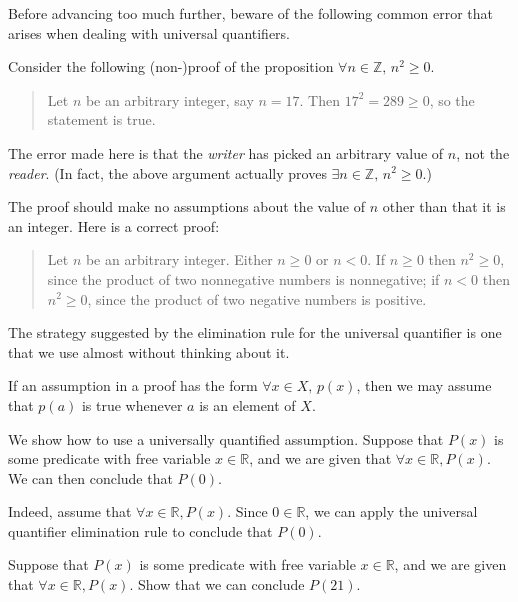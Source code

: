 Before advancing too much further, beware of the following common error that arises when dealing with universal quantifiers.

\begin{commonerror}
Consider the following (non-)proof of the proposition $\forall n \in \mathbb{Z},\, n^2 \ge 0$.

\begin{quote}
Let $n$ be an arbitrary integer, say $n=17$. Then $17^2 = 289 \ge 0$, so the statement is true.
\end{quote}

The error made here is that the \textit{writer} has picked an arbitrary value of $n$, not the \textit{reader}. (In fact, the above argument actually proves $\exists n \in \mathbb{Z},\, n^2 \ge 0$.)

The proof should make no assumptions about the value of $n$ other than that it is an integer. Here is a correct proof:

\begin{quote}
Let $n$ be an arbitrary integer. Either $n \ge 0$ or $n < 0$. If $n \ge 0$ then $n^2 \ge 0$, since the product of two nonnegative numbers is nonnegative; if $n<0$ then $n^2 \ge 0$, since the product of two negative numbers is positive.
\end{quote}
\end{commonerror}

The strategy suggested by the elimination rule for the universal quantifier is one that we use almost without thinking about it.

\begin{strategy}
\label{strAssumingUniversal}
If an assumption in a proof has the form $\forall x \in X,\, p(x)$, then we may assume that $p(a)$ is true whenever $a$ is an element of $X$.
\end{strategy}

\begin{example}
We show how to use a universally quantified assumption. Suppose that $P(x)$ is some predicate with free variable $x \in \mathbb{R}$, and we are given that $\forall x \in \mathbb{R}, P(x)$. We can then conclude that $P(0)$.

Indeed, assume that $\forall x \in \mathbb{R}, P(x)$. Since $0 \in \mathbb{R}$, we can apply the universal quantifier elimination rule to conclude that $P(0)$.
\end{example}

\begin{exercise}
Suppose that $P(x)$ is some predicate with free variable $x \in \mathbb{R}$, and we are given that $\forall x \in \mathbb{R}, P(x)$. Show that we can conclude $P(21)$.
\end{exercise}

